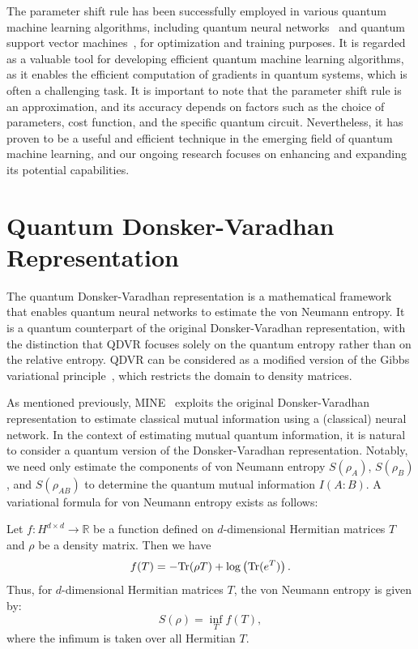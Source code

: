 \documentclass[aps,groupedaddress,superscriptaddress,amssymb,amsmath,amsbsy,amsfonts,twocolumn,pra]{revtex4}
\begin{document}
The parameter shift rule has been successfully employed in various quantum machine learning algorithms, including quantum neural networks~\cite{BBF+20,BLSF19} and quantum support vector machines~\cite{RML14,HCT+19}, for optimization and training purposes. It is regarded as a valuable tool for developing efficient quantum machine learning algorithms, as it enables the efficient computation of gradients in quantum systems, which is often a challenging task. It is important to note that the parameter shift rule is an approximation, and its accuracy depends on factors such as the choice of parameters, cost function, and the specific quantum circuit. Nevertheless, it has proven to be a useful and efficient technique in the emerging field of quantum machine learning, and our ongoing research focuses on enhancing and expanding its potential capabilities.

\section{Quantum Donsker-Varadhan Representation} \label{sec:QDV}
The quantum Donsker-Varadhan representation is a mathematical framework that enables quantum neural networks to estimate the von Neumann entropy. It is a quantum counterpart of the original Donsker-Varadhan representation, with the distinction that QDVR focuses solely on the quantum entropy rather than on the relative entropy. QDVR can be considered as a modified version of the Gibbs variational principle~\cite{H68}, which restricts the domain to density matrices.

As mentioned previously, MINE~\cite{BBR+18} exploits the original Donsker-Varadhan representation to estimate classical mutual information using a (classical) neural network. In the context of estimating mutual quantum information, it is natural to consider a quantum version of the Donsker-Varadhan representation. Notably, we need only estimate the components of von Neumann entropy $S(\rho_A)$, $S(\rho_B)$, and $S(\rho_{AB})$ to determine the quantum mutual information $I(A:B)$. A variational formula for von Neumann entropy exists as follows:

\begin{theorem} \label{gibbs}
Let $f: H^{d \times d} \rightarrow \mathbb{R}$ be a function defined on $d$-dimensional Hermitian matrices $T$ and $\rho$ be a density matrix. Then we have
\begin{equation} \label{eq:qdv}
f(T) = -\mbox{$\textnormal{Tr}$}(\rho T) + \log\left(\mbox{$\textnormal{Tr}$}(e^T)\right).
\end{equation}
Thus, for $d$-dimensional Hermitian matrices $T$, the von Neumann entropy is given by:
\begin{equation} \label{identity}
S(\rho) = \inf_{T} f(T),
\end{equation}
where the infimum is taken over all Hermitian $T$.
\end{theorem}
\end{document}
